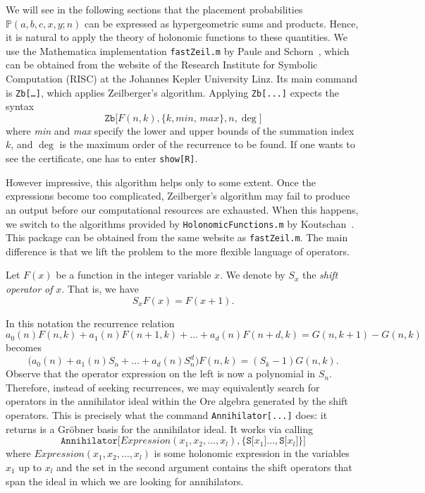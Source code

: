 \documentclass{amsart}
\numberwithin{equation}{section}
\begin{document}
We will see in the following sections that the placement probabilities $\mathbb{P}(a,b,c,x,y;n)$ can be expressed as hypergeometric sums and products. Hence, it is natural to apply the theory of holonomic functions to these quantities. We use the Mathematica implementation \texttt{fastZeil.m} by Paule and Schorn~\cite{Paule}, which can be obtained from the website of the Research Institute for Symbolic Computation (RISC) at the Johannes Kepler University Linz. Its main command is \texttt{Zb[…]}, which applies Zeilberger’s algorithm. 
Applying \texttt{Zb[...]} expects the syntax
\[\texttt{Zb[}F(n,k),\{k,\textit{min, max}\},n,\deg\texttt{]}\]
where \textit{min} and \textit{max} specify the lower and upper bounds of the summation index $k$, and $\deg$ is the maximum order of the recurrence to be found. If one wants to see the certificate, one has to enter \texttt{show[R]}. 

However impressive, this algorithm helps only to some extent. Once the expressions become too complicated, Zeilberger’s algorithm may fail to produce an output before our computational resources are exhausted. When this happens, we switch to the algorithms provided by \texttt{HolonomicFunctions.m} by Koutschan~\cite{KoutschanThesis,Koutschan}. This package can be obtained from the same website as \texttt{fastZeil.m}. The main difference is that we lift the problem to the more flexible language of operators.
\begin{nota}
    Let $F(x)$ be a function in the integer variable $x$. We denote by $S_{x}$ the \textit{shift operator of} $x$. That is, we have
    \[S_{x}F(x)=F(x+1).\]
\end{nota}
In this notation the recurrence relation
\[a_0(n)F(n,k)+a_1(n)F(n+1,k)+\dots +a_d(n)F(n+d,k)=G(n,k+1)-G(n,k)\]
becomes
\[\big(a_0(n)+a_1(n)S_n+\dots +a_d(n)S_n^d\big)F(n,k)=(S_k-1)G(n,k).\]
Observe that the operator expression on the left is now a polynomial in $S_n$. Therefore, instead of seeking recurrences, we may equivalently search for operators in the annihilator ideal within the Ore algebra generated by the shift operators. This is precisely what the command \texttt{Annihilator[...]} does: it returns is a Gröbner basis for the annihilator ideal. It works via calling
\[\texttt{Annihilator[}\textit{Expression}(x_1,x_2,\dots,x_l),\{\texttt{S[}x_1\texttt{]}\dots,\texttt{S[}x_l\texttt{]}\}\texttt{]}\]
where $\textit{Expression}(x_1,x_2,\dots,x_l)$ is some holonomic expression in the variables $x_1$ up to $x_l$ and the set in the second argument contains the shift operators that span the ideal in which we are looking for annihilators.
\end{document}
